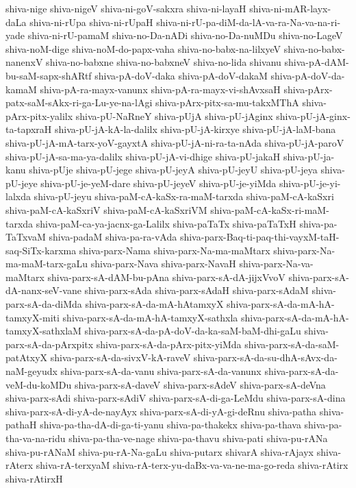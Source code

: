 {shiva-nige
shiva-nigeV
shiva-ni-goV-sakxra
shiva-ni-layaH
shiva-ni-mAR-layx-daLa
shiva-ni-rUpa
shiva-ni-rUpaH
shiva-ni-rU-pa-diM-da-lA-va-ra-Na-va-na-ri-yade
shiva-ni-rU-pamaM
shiva-no-Da-nADi
shiva-no-Da-nuMDu
shiva-no-LageV
shiva-noM-dige
shiva-noM-do-papx-vaha
shiva-no-babx-na-lilxyeV
shiva-no-babx-nanenxV
shiva-no-babxne
shiva-no-babxneV
shiva-no-lida
shivanu
shiva-pA-dAM-bu-saM-sapx-shARtf
shiva-pA-doV-daka
shiva-pA-doV-dakaM
shiva-pA-doV-da-kamaM
shiva-pA-ra-mayx-vanunx
shiva-pA-ra-mayx-vi-shAvxsaH
shiva-pArx-patx-saM-sAkx-ri-ga-Lu-ye-na-lAgi
shiva-pArx-pitx-sa-mu-takxMThA
shiva-pArx-pitx-yalilx
shiva-pU-NaRneY
shiva-pUjA
shiva-pU-jAginx
shiva-pU-jA-ginx-ta-tapxraH
shiva-pU-jA-kA-la-dalilx
shiva-pU-jA-kirxye
shiva-pU-jA-laM-bana
shiva-pU-jA-mA-tarx-yoV-gayxtA
shiva-pU-jA-ni-ra-ta-nAda
shiva-pU-jA-paroV
shiva-pU-jA-sa-ma-ya-dalilx
shiva-pU-jA-vi-dhige
shiva-pU-jakaH
shiva-pU-ja-kanu
shiva-pUje
shiva-pU-jege
shiva-pU-jeyA
shiva-pU-jeyU
shiva-pU-jeya
shiva-pU-jeye
shiva-pU-je-yeM-dare
shiva-pU-jeyeV
shiva-pU-je-yiMda
shiva-pU-je-yi-lalxda
shiva-pU-jeyu
shiva-paM-cA-kaSx-ra-maM-tarxda
shiva-paM-cA-kaSxri
shiva-paM-cA-kaSxriV
shiva-paM-cA-kaSxriVM
shiva-paM-cA-kaSx-ri-maM-tarxda
shiva-paM-ca-ya-jacnx-ga-Lalilx
shiva-paTaTx
shiva-paTaTxH
shiva-pa-TaTxvaM
shiva-padaM
shiva-pa-ra-vAda
shiva-parx-Baq-ti-paq-thi-vayxM-taH-saq-SiTx-karxma
shiva-parx-Nama
shiva-parx-Na-ma-maMtarx
shiva-parx-Na-ma-maM-tarx-gaLu
shiva-parx-Nava
shiva-parx-NavaH
shiva-parx-Na-va-maMtarx
shiva-parx-sA-dAM-bu-pAna
shiva-parx-sA-dA-jijxVvoV
shiva-parx-sA-dA-nanx-seV-vane
shiva-parx-sAda
shiva-parx-sAdaH
shiva-parx-sAdaM
shiva-parx-sA-da-diMda
shiva-parx-sA-da-mA-hAtamxyX
shiva-parx-sA-da-mA-hA-tamxyX-miti
shiva-parx-sA-da-mA-hA-tamxyX-sathxla
shiva-parx-sA-da-mA-hA-tamxyX-sathxlaM
shiva-parx-sA-da-pA-doV-da-ka-saM-baM-dhi-gaLu
shiva-parx-sA-da-pArxpitx
shiva-parx-sA-da-pArx-pitx-yiMda
shiva-parx-sA-da-saM-patAtxyX
shiva-parx-sA-da-sivxV-kA-raveV
shiva-parx-sA-da-su-dhA-sAvx-da-naM-geyudx
shiva-parx-sA-da-vanu
shiva-parx-sA-da-vanunx
shiva-parx-sA-da-veM-du-koMDu
shiva-parx-sA-daveV
shiva-parx-sAdeV
shiva-parx-sA-deVna
shiva-parx-sAdi
shiva-parx-sAdiV
shiva-parx-sA-di-ga-LeMdu
shiva-parx-sA-dina
shiva-parx-sA-di-yA-de-nayAyx
shiva-parx-sA-di-yA-gi-deRnu
shiva-patha
shiva-pathaH
shiva-pa-tha-dA-di-ga-ti-yanu
shiva-pa-thakekx
shiva-pa-thava
shiva-pa-tha-va-na-ridu
shiva-pa-tha-ve-nage
shiva-pa-thavu
shiva-pati
shiva-pu-rANa
shiva-pu-rANaM
shiva-pu-rA-Na-gaLu
shiva-putarx
shivarA
shiva-rAjayx
shiva-rAterx
shiva-rA-terxyaM
shiva-rA-terx-yu-daBx-va-va-ne-ma-go-reda
shiva-rAtirx
shiva-rAtirxH
}
